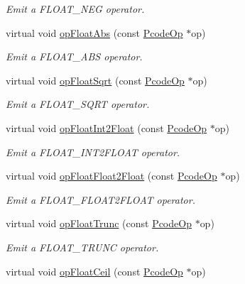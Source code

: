 \begin{DoxyCompactItemize}
\begin{DoxyCompactList}\small\item\em Emit a F\+L\+O\+A\+T\+\_\+\+N\+EG operator. \end{DoxyCompactList}\item 
virtual void \mbox{\hyperlink{class_print_c_a1ca4918cf0ad64762607901fcbedebc6}{op\+Float\+Abs}} (const \mbox{\hyperlink{class_pcode_op}{Pcode\+Op}} $\ast$op)
\begin{DoxyCompactList}\small\item\em Emit a F\+L\+O\+A\+T\+\_\+\+A\+BS operator. \end{DoxyCompactList}\item 
virtual void \mbox{\hyperlink{class_print_c_a57f5e81ff43685a4c6f4dda04c39e792}{op\+Float\+Sqrt}} (const \mbox{\hyperlink{class_pcode_op}{Pcode\+Op}} $\ast$op)
\begin{DoxyCompactList}\small\item\em Emit a F\+L\+O\+A\+T\+\_\+\+S\+Q\+RT operator. \end{DoxyCompactList}\item 
virtual void \mbox{\hyperlink{class_print_c_a042bf6eb6b670d668597a81c0aba5938}{op\+Float\+Int2\+Float}} (const \mbox{\hyperlink{class_pcode_op}{Pcode\+Op}} $\ast$op)
\begin{DoxyCompactList}\small\item\em Emit a F\+L\+O\+A\+T\+\_\+\+I\+N\+T2\+F\+L\+O\+AT operator. \end{DoxyCompactList}\item 
virtual void \mbox{\hyperlink{class_print_c_aa1108124c08e3412dd455dad8e4825e9}{op\+Float\+Float2\+Float}} (const \mbox{\hyperlink{class_pcode_op}{Pcode\+Op}} $\ast$op)
\begin{DoxyCompactList}\small\item\em Emit a F\+L\+O\+A\+T\+\_\+\+F\+L\+O\+A\+T2\+F\+L\+O\+AT operator. \end{DoxyCompactList}\item 
virtual void \mbox{\hyperlink{class_print_c_ac0c565dff86b4adec2ba53d1f3e1409b}{op\+Float\+Trunc}} (const \mbox{\hyperlink{class_pcode_op}{Pcode\+Op}} $\ast$op)
\begin{DoxyCompactList}\small\item\em Emit a F\+L\+O\+A\+T\+\_\+\+T\+R\+U\+NC operator. \end{DoxyCompactList}\item 
virtual void \mbox{\hyperlink{class_print_c_a3a5b6a34c7a409acff8bbeb04735b8d1}{op\+Float\+Ceil}} (const \mbox{\hyperlink{class_pcode_op}{Pcode\+Op}} $\ast$op)

\end{DoxyCompactItemize}
